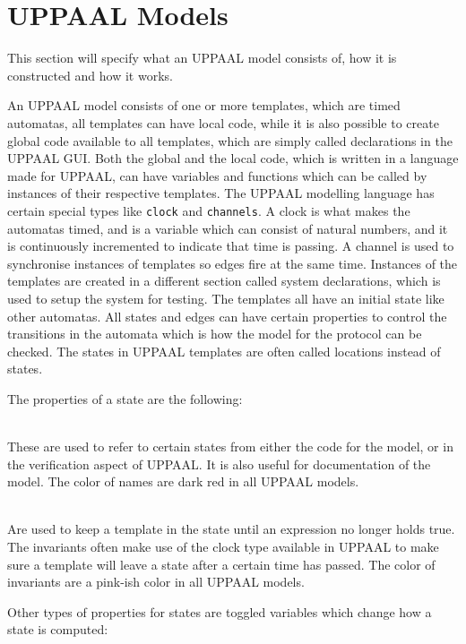 \section{UPPAAL Models}
This section will specify what an UPPAAL model consists of, how it is constructed and how it works.

An UPPAAL model consists of one or more templates, which are timed automatas, all templates can have local code, while it is also possible to create global code available to all templates, which are simply called declarations in the UPPAAL GUI.
Both the global and the local code, which is written in a language made for UPPAAL, can have variables and functions which can be called by instances of their respective templates.
The UPPAAL modelling language has certain special types like \texttt{clock} and \texttt{channels}.
A clock is what makes the automatas timed, and is a variable which can consist of natural numbers, and it is continuously incremented to indicate that time is passing.
A channel is used to synchronise instances of templates so edges fire at the same time.
Instances of the templates are created in a different section called system declarations, which is used to setup the system for testing.
The templates all have an initial state like other automatas.
All states and edges can have certain properties to control the transitions in the automata which is how the model for the protocol can be checked.
The states in UPPAAL templates are often called locations instead of states.

\bigskip\noindent
The properties of a state are the following: 

\begin{description}[labelindent=\parindent]
    \item[Name]\hfill\\
    These are used to refer to certain states from either the code for the model, or in the verification aspect of UPPAAL. It is also useful for documentation of the model. The color of names are dark red in all UPPAAL models.
    \item[Invariants]\hfill\\
    Are used to keep a template in the state until an expression no longer holds true. The invariants often make use of the clock type available in UPPAAL to make sure a template will leave a state after a certain time has passed. The color of invariants are a pink-ish color in all UPPAAL models.
\end{description}

Other types of properties for states are toggled variables which change how a state is computed:

